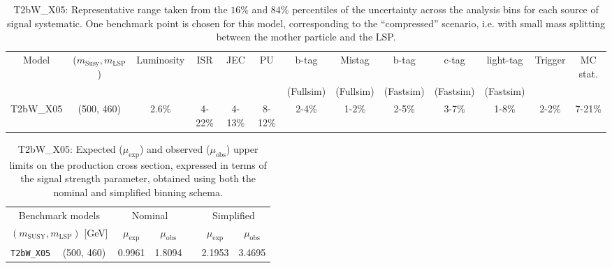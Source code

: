 \begin{landscape}
\begin{table}[H]
    \label{tab:T2bWSUS16038systs}
    \centering
    \small
    \begin{tabular}{ ccccccccccccc }
        \hline \hline
        Model & ($m_{\mathrm{Susy}},m_{\mathrm{LSP}}$) & Luminosity & ISR & JEC & PU & b-tag & Mistag & b-tag & c-tag & light-tag & Trigger & MC stat. \\
        & & & & & & (Fullsim) & (Fullsim) & (Fastsim) & (Fastsim) & (Fastsim) & & \\ \hline
        T2bW\_X05 & (500, 460) & 2.6\% & 4-22\% & 4-13\% & 8-12\% & 2-4\% & 1-2\% & 2-5\% & 3-7\% & 1-8\% & 2-2\% & 7-21\% \\
        \hline \hline
        \end{tabular}
    \caption{T2bW\_X05: Representative range taken from the $16\%$ and $84\%$ percentiles of the uncertainty across the analysis bins for each source of signal systematic. One benchmark point is chosen for this model, corresponding to the ``compressed'' scenario, i.e. with small mass splitting between the mother particle and the LSP.}
\end{table}
\end{landscape}

\begin{table}[H]
  \centering
  \begin{tabular}{ llccccc }
    \hline
    \multicolumn{2}{c}{Benchmark models}    & \multicolumn{2}{c}{Nominal}
                                            &
                                            & \multicolumn{2}{c}{Simplified}             \\ [0.3ex]
    \cline{3-4}
    \cline{6-7}
    \multicolumn{2}{c}{$(m_{\text{SUSY}}, m_{\mathrm{LSP}})$ [GeV]}
                                            & $\mu_{\text{exp}}$
                                            & $\mu_{\text{obs}}$
                                            &
                                            & $\mu_{\text{exp}}$
                                            & $\mu_{\text{obs}}$                         \\ [0.3ex]
    \hline
    \texttt{T2bW\_X05} & (500, 460) & 0.9961 & 1.8094 & & 2.1953 & 3.4695 \\
        \hline
  \end{tabular}
  \caption{T2bW\_X05: Expected ($\mu_{\mathrm{exp}}$) and observed ($\mu_{\mathrm{obs}}$) upper limits on the production cross section, expressed in terms of the signal strength parameter, obtained using both the nominal and simplified binning schema.}
\end{table}

